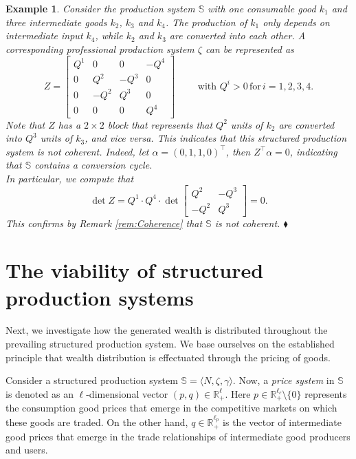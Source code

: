 \documentclass[11pt,fleqn]{article}
\newtheorem{expl}[theorem]{Example}
\newenvironment{example}{\begin{expl} \rm}{\hfill $\blacklozenge$
\end{expl}}
\begin{document}
\begin{example} \label{ex:Coherence}
	Consider the production system $\mathbb{S}$ with one consumable good $k_1$ and three intermediate goods $k_2$, $k_3$ and $k_4$. The production of $k_1$ only depends on intermediate input $k_4$, while $k_2$ and $k_3$ are converted into each other. A corresponding professional production system $\zeta$ can be represented as
	\[
	Z=\left[ \begin{array}{cccc}
	Q^1&0&0&-Q^4\\
	0&Q^2&-Q^3&0\\
	0&-Q^2&Q^3&0\\
	0&0&0&Q^4	 
	\end{array}\right] \qquad \mbox{ with } Q^i>0\,\mbox{for} \, i=1,2,3,4. 
	\]
	Note that $Z$ has a $2 \times 2$ block that represents that $Q^2$ units of $k_2$ are converted into $Q^3$ units of $k_3$, and vice versa. This indicates that this structured production system is \emph{not} coherent. Indeed, let $\alpha = (0,1,1,0)^\top$, then $Z^\top \alpha = 0$, indicating that $\mathbb S$ contains a conversion cycle. 
	\\[1ex]
	In particular, we compute that
	\[
	\det Z = Q^1 \cdot Q^4 \cdot \det \left[
	\begin{array}{cc}
	Q^2 & - Q^3 \\
	- Q^2 & Q^3
	\end{array}
	\right] =0.
	\]
	This confirms by Remark \ref{rem:Coherence} that $\mathbb S$ is not coherent. 
\end{example}


\section{The viability of structured production systems}\label{sec:Viability}

Next, we investigate how the generated wealth is distributed throughout the prevailing structured production system. We base ourselves on the established principle that wealth distribution is effectuated through the pricing of goods.

Consider a structured production system $\mathbb S = \langle N, \zeta , \gamma \rangle$.  Now, a \emph{price system} in $\mathbb S$ is denoted as an $\ell$-dimensional vector $(p,q) \in \mathbb R^{\ell}_+$. Here $p \in \mathbb R^{\ell_c}_+ \setminus \{ 0 \}$ represents the consumption good prices that emerge in the competitive markets on which these goods are traded. On the other hand, $q \in \mathbb R^{\ell_p}_+$ is the vector of intermediate good prices that emerge in the trade relationships of intermediate good producers and users. 
\end{document}
